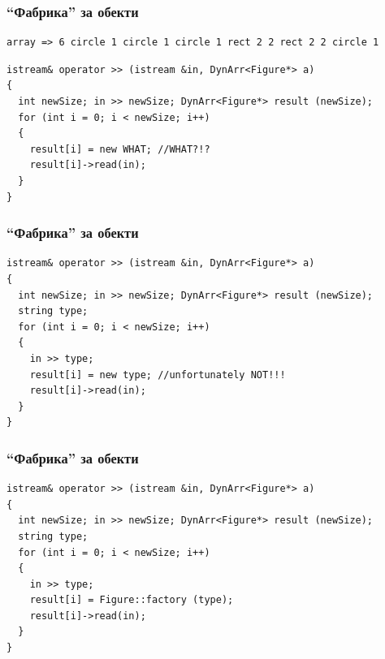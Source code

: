 \documentclass{beamer}
\begin{document}
\begin{frame}[fragile]
\frametitle{``Фабрика'' за обекти}


\begin{flushleft}
\begin{lstlisting}
array => 6 circle 1 circle 1 circle 1 rect 2 2 rect 2 2 circle 1 
\end{lstlisting}  
\end{flushleft}

\begin{flushleft}
\begin{lstlisting}
istream& operator >> (istream &in, DynArr<Figure*> a)
{
  int newSize; in >> newSize; DynArr<Figure*> result (newSize);
  for (int i = 0; i < newSize; i++)
  {
    result[i] = new WHAT; //WHAT?!?
    result[i]->read(in);
  }
}
\end{lstlisting}  
\end{flushleft}


\end{frame}







\begin{frame}[fragile]
\frametitle{``Фабрика'' за обекти}


\begin{flushleft}
\begin{lstlisting}
istream& operator >> (istream &in, DynArr<Figure*> a)
{
  int newSize; in >> newSize; DynArr<Figure*> result (newSize);
  string type;
  for (int i = 0; i < newSize; i++)
  {
    in >> type;
    result[i] = new type; //unfortunately NOT!!!
    result[i]->read(in);
  }
}
\end{lstlisting}  
\end{flushleft}



\end{frame}

\begin{frame}[fragile]
\frametitle{``Фабрика'' за обекти}


\begin{flushleft}
\begin{lstlisting}
istream& operator >> (istream &in, DynArr<Figure*> a)
{
  int newSize; in >> newSize; DynArr<Figure*> result (newSize);
  string type;
  for (int i = 0; i < newSize; i++)
  {
    in >> type;
    result[i] = Figure::factory (type); 
    result[i]->read(in);
  }
}
\end{lstlisting}  
\end{flushleft}


\end{frame}
\end{document}
